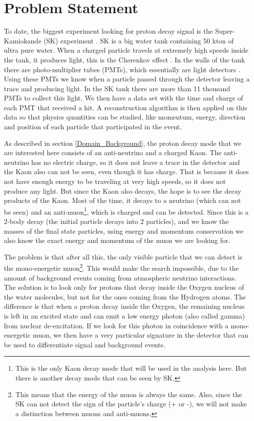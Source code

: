 \documentclass[11pt, oneside]{article}   	%
\begin{document}
\section{Problem Statement}

To date, the biggest experiment looking for proton decay signal is the Super-Kamiokande (SK) experiment \cite{SK}. SK is a big water tank containing 50 kton of ultra pure water. When a charged particle travels at extremely high speeds inside the tank, it produces light, this is the Cherenkov effect \cite{Cherenkov}. In the walls of the tank there are photo-multiplier tubes (PMTs), which essentially are light detectors \cite{PMT}. Using these PMTs we know when a particle passed through the detector leaving a trace and producing light. In the SK tank there are more than 11 thousand PMTs to collect this light. We then have a data set with the time and charge of each PMT that received a hit. A reconstruction algorithm is then applied on this data so that physics quantities can be studied, like momentum, energy, direction and position of each particle that participated in the event.

As described in section \ref{Domain_Background}, the proton decay mode that we are interested here consists of an anti-neutrino and a charged Kaon. The anti-neutrino has no electric charge, so it does not leave a trace in the detector and the Kaon also can not be seen, even though it has charge. That is because it does not have enough energy to be traveling at very high speeds, so it does not produce any light. But since the Kaon also decays, the hope is to see the decay products of the Kaon. Most of the time, it decays to a neutrino (which can not be seen) and an anti-muon\footnote{This is the only Kaon decay mode that will be used in the analysis here. But there is another decay mode that can be seen by SK.}, which is charged and can be detected. Since this is a 2-body decay (the initial particle decays into 2 particles), and we know the masses of the final state particles, using energy and momentum conservation we also know the exact energy and momentum of the muon we are looking for.

The problem is that after all this, the only visible particle that we can detect is the mono-energetic muon\footnote{This means that the energy of the muon is always the same. Also, since the SK can not detect the sign of the particle's charge (+ or -), we will not make a distinction between muons and anti-muons.}. This would make the search impossible, due to the amount of background events coming from atmospheric neutrino interactions. The solution is to look only for protons that decay inside the Oxygen nucleus of the water molecules, but not for the ones coming from the Hydrogen atoms. The difference is that when a proton decay inside the Oxygen, the remaining nucleus is left in an excited state and can emit 
a low energy photon (also called gamma) from nuclear de-excitation. If we look for this photon in coincidence with a mono-energetic muon, we then have a very particular signature in the detector that can be used to differentiate signal and background events.
\end{document}
